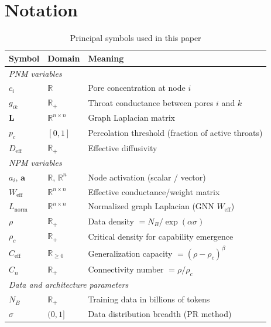 \documentclass[11pt,a4paper]{article}
\begin{document}

\section*{Notation}
\label{sec:notation}
\begin{table}[H]
\centering
\caption{Principal symbols used in this paper}
\begin{tabular}{llp{7cm}}
\toprule
\textbf{Symbol} & \textbf{Domain} & \textbf{Meaning} \\
\midrule
\multicolumn{3}{l}{\textit{PNM variables}} \\
$c_i$       & $\mathbb{R}$      & Pore concentration at node $i$ \\
$g_{ik}$    & $\mathbb{R}_{+}$  & Throat conductance between pores $i$ and $k$ \\
$\mathbf{L}$& $\mathbb{R}^{n\times n}$ & Graph Laplacian matrix \\
$p_c$       & $[0,1]$           & Percolation threshold (fraction of active throats) \\
$D_{\text{eff}}$ & $\mathbb{R}_{+}$ & Effective diffusivity \\
\midrule
\multicolumn{3}{l}{\textit{NPM variables}} \\
$a_i$, $\mathbf{a}$ & $\mathbb{R}$, $\mathbb{R}^n$ & Node activation (scalar / vector) \\
$W_{\text{eff}}$    & $\mathbb{R}^{n\times n}$ & Effective conductance/weight matrix \\
$L_{\text{norm}}$   & $\mathbb{R}^{n\times n}$ & Normalized graph Laplacian (GNN $W_{\text{eff}}$) \\
$\rho$      & $\mathbb{R}_{+}$  & Data density $= N_B/\exp(\alpha\sigma)$ \\
$\rho_c$    & $\mathbb{R}_{+}$  & Critical density for capability emergence \\
$C_{\text{eff}}$ & $\mathbb{R}_{\geq0}$ & Generalization capacity $= (\rho-\rho_c)^\beta$ \\
$C_n$       & $\mathbb{R}_{+}$  & Connectivity number $= \rho/\rho_c$ \\
\midrule
\multicolumn{3}{l}{\textit{Data and architecture parameters}} \\
$N_B$       & $\mathbb{R}_{+}$  & Training data in billions of tokens \\
$\sigma$    & $(0,1]$           & Data distribution breadth (PR method) \\

\end{tabular}
\end{table}
\end{document}
